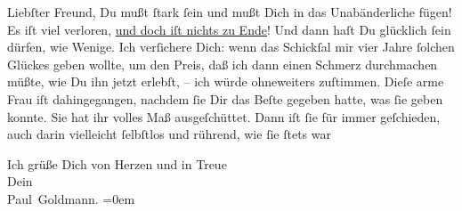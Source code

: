 \pstart
           Liebſter Freund, Du mußt ſtark ſein und mußt Dich in das Unabänderliche fügen! Es iſt
               viel verloren, \uline{und doch iſt nichts zu Ende}! Und dann
               haſt Du \label{K_L02871-8v}\label{K_L02871-8}
               glücklich ſein dürfen, wie Wenige. Ich verſichere Dich: wenn das Schickſal mir vier
               Jahre ſolchen Glückes geben wollte, um den Preis, daß ich dann einen Schmerz
               durchmachen müßte, wie Du ihn jetzt erlebſt, – ich würde ohneweiters zuſtimmen. Dieſe
               arme Frau iſt dahingegangen,
               nachdem ſie Dir das Beſte gegeben hatte, was ſie geben konnte. Sie hat ihr volles Maß
               ausgeſchüttet. Dann iſt ſie für immer geſchieden, auch darin vielleicht ſelbſtlos und
                  \strikeout{\textcolor{gray}{×}\-\textcolor{gray}{×}\-\textcolor{gray}{×}} rührend, wie ſie ſtets war{\dotsfive}\pend
           
\pstart
           Ich grüße Dich von Herzen und in Treue {\\[\baselineskip]}Dein {\\[\baselineskip]}\spacefill\mbox{Paul Goldmann.}\pend
           \leftskip=0em{}\endnumbering{}  
      
